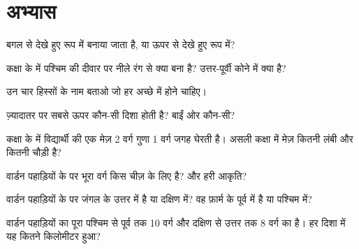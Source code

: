 \section{अभ्यास}

\begin{exercise}[$\star$]\label{exo:g2:drawing-to-map:1}
 बगल से देखे हुए रूप में बनाया जाता है, या ऊपर से देखे हुए रूप में?
\end{exercise}

\begin{exercise}[$\star$]\label{exo:g2:drawing-to-map:2}
कक्षा के  में पश्चिम की दीवार पर नीले रंग से क्या बना है? उत्तर-पूर्वी
कोने में क्या है?
\end{exercise}

\begin{exercise}[$\star$]\label{exo:g2:drawing-to-map:3}
उन चार हिस्सों के नाम बताओ जो हर अच्छे  में होने चाहिए।
\end{exercise}

\begin{exercise}[$\star$]\label{exo:g2:drawing-to-map:4}
ज़्यादातर  पर सबसे ऊपर कौन-सी दिशा होती है? बाईं ओर कौन-सी?
\end{exercise}

\begin{exercise}[$\star$]\label{exo:g2:drawing-to-map:5}
कक्षा के  में विद्यार्थी की एक मेज़ 2 वर्ग गुणा 1 वर्ग जगह घेरती है।
असली कक्षा में मेज़ कितनी लंबी और कितनी चौड़ी है?
\end{exercise}

\begin{exercise}[$\star$]\label{exo:g2:drawing-to-map:6}
वार्डन पहाड़ियों के  पर भूरा वर्ग किस चीज़ के लिए है? और हरी
आकृति?
\end{exercise}

\begin{exercise}[$\star\star$]\label{exo:g2:drawing-to-map:7}
वार्डन पहाड़ियों के  पर जंगल  के उत्तर में है या दक्षिण में?
वह फ़ार्म के पूर्व में है या पश्चिम में?
\end{exercise}

\begin{exercise}[$\star\star$]\label{exo:g2:drawing-to-map:8}
वार्डन पहाड़ियों का पूरा  पश्चिम से पूर्व तक 10 वर्ग और दक्षिण से
उत्तर तक 8 वर्ग का है। हर दिशा में यह कितने किलोमीटर हुआ?
\end{exercise}

